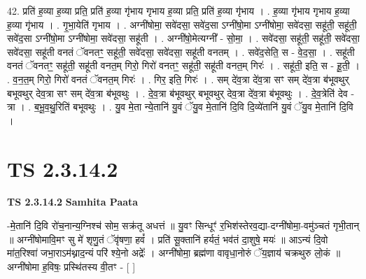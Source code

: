 \documentclass[17pt]{extarticle}
\begin{document}
42. प्रति॑ ह॒व्या ह॒व्या प्रति॒ प्रति॑ ह॒व्या गृ॑भाय गृभाय ह॒व्या प्रति॒ प्रति॑ ह॒व्या गृ॑भाय । . ह॒व्या गृ॑भाय गृभाय ह॒व्या ह॒व्या गृ॑भाय । . गृ॒भा॒येति॑ गृभाय । . अग्नी॑षोमा॒ सवे॑दसा॒ सवे॑द॒सा ऽग्नी॑षो॒मा ऽग्नी॑षोमा॒ सवे॑दसा॒ सहू॑ती॒ सहू॑ती॒ सवे॑द॒सा ऽग्नी॑षो॒मा ऽग्नी॑षोमा॒ सवे॑दसा॒ सहू॑ती । . अग्नी॑षो॒मेत्यग्नी᳚ - सो॒मा॒ । . सवे॑दसा॒ सहू॑ती॒ सहू॑ती॒ सवे॑दसा॒ सवे॑दसा॒ सहू॑ती वनतं ॅवनतꣳ॒॒ सहू॑ती॒ सवे॑दसा॒ सवे॑दसा॒ सहू॑ती वनतम् । . सवे॑द॒सेति॒ स - वे॒द॒सा॒ । . सहू॑ती वनतं ॅवनतꣳ॒॒ सहू॑ती॒ सहू॑ती वनत॒म् गिरो॒ गिरो॑ वनतꣳ॒॒ सहू॑ती॒ सहू॑ती वनत॒म् गिरः॑ । . सहू॑ती॒ इति॒ स - हू॒ती॒ । . व॒न॒त॒म् गिरो॒ गिरो॑ वनतं ॅवनत॒म् गिरः॑ । . गिर॒ इति॒ गिरः॑ । . सम् दे॑व॒त्रा दे॑व॒त्रा सꣳ सम् दे॑व॒त्रा ब॑भूवथुर् बभूवथुर् देव॒त्रा सꣳ सम् दे॑व॒त्रा ब॑भूवथुः । . दे॒व॒त्रा ब॑भूवथुर् बभूवथुर् देव॒त्रा दे॑व॒त्रा ब॑भूवथुः । . दे॒व॒त्रेति॑ देव - त्रा । . ब॒भू॒व॒थु॒रिति॑ बभूवथुः । . यु॒व मे॒ता न्ये॒तानि॑ यु॒वं ॅयु॒व मे॒तानि॑ दि॒वि दि॒व्ये॑तानि॑ यु॒वं ॅयु॒व मे॒तानि॑ दि॒वि । \newline
\pagebreak
{}
\section*{ TS 2.3.14.2 }

\textbf{TS 2.3.14.2 } \newline
\textbf{Samhita Paata} \newline

-मे॒तानि॑ दि॒वि रो॑च॒नान्य॒ग्निश्च॑ सोम॒ सक्र॑तू अधत्तं ॥ यु॒वꣳ सिन्धूꣳ॑ र॒भिश॑स्तेरव॒द्या-दग्नी॑षोमा॒-वमु॑ञ्चतं गृभी॒तान् ॥ अग्नी॑षोमावि॒मꣳ सु मे॑ शृणु॒तं ॅवृ॑षणा॒ हवं᳚ । प्रति॑ सू॒क्तानि॑ हर्यतं॒ भव॑तं दा॒शुषे॒ मयः॑ ॥ आऽन्यं दि॒वो मा॑त॒रिश्वा॑ जभा॒राऽम॑थ्नाद॒न्यं परि॑ श्ये॒नो अद्रेः᳚ । अग्नी॑षोमा॒ ब्रह्म॑णा वावृधा॒नोरुं ॅय॒ज्ञाय॑ चक्रथुरु लो॒कं ॥अग्नी॑षोमा ह॒विषः॒ प्रस्थि॑तस्य वी॒तꣳ - [  ] \newline
\end{document}
